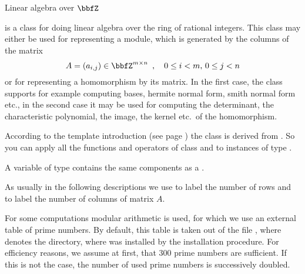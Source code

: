 

\NAME

 \dotfill Linear algebra over $\bbfZ$



\ABSTRACT

 is a class for doing linear algebra over the ring of rational integers.
This class may either be used for representing a module, which is generated by the columns of the
matrix
\begin{displaymath}
  A = (a_{i,j}) \in \bbfZ^{m\times n} \enspace,\quad 0 \leq i < m,\, 0 \leq j < n
\end{displaymath}
or for representing a homomorphism by its matrix.  In the first case, the class supports for
example computing bases, hermite normal form, smith normal form etc., in the second case it may
be used for computing the determinant, the characteristic polynomial, the image, the kernel
etc.~of the homomorphism.

According to the template introduction (see page \pageref{template_introduction2}) the class
 is derived from .  So you can apply all the
functions and operators of class  and 
to instances of type .



\DESCRIPTION

A variable of type  contains the same components as a .

As usually in the following descriptions we use  to label the number of rows and
 to label the number of columns of matrix $A$.

For some computations modular arithmetic is used, for which we use an external table of prime
numbers.  By default, this table is taken out of the file
, where  denotes the
directory, where \LiDIA was installed by the installation procedure.  For efficiency reasons, we
assume at first, that 300 prime numbers are sufficient.  If this is not the case, the number of
used prime numbers is successively doubled.

